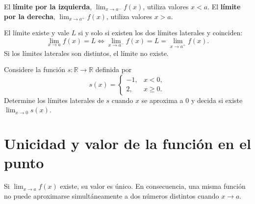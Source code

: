 \documentclass[10pt,a5paper]{article}
\newif\ifmostrarSoluciones
\begin{document}
\begin{center}
\end{center}

\begin{definicion}
El \textbf{límite por la izquierda}, $\lim_{x\to a^-}f(x)$, utiliza valores $x<a$. El \textbf{límite por la derecha}, $\lim_{x\to a^+}f(x)$, utiliza valores $x>a$.
\end{definicion}

\begin{teorema}
El límite existe y vale $L$ si y solo si existen los dos límites laterales y coinciden:
\[
\lim_{x\to a}f(x)=L
\iff
\lim_{x\to a^-}f(x)=L=\lim_{x\to a^+}f(x).
\]
Si los límites laterales son distintos, el límite no existe.
\end{teorema}

\begin{ejemplo}[salto]
Considere la función $s:\mathbb{R}\to\mathbb{R}$ definida por
\[
s(x)=
\begin{cases}
  -1, & x<0,\\
  2, & x\geq0.
\end{cases}
\]
Determine los límites laterales de $s$ cuando $x$ se aproxima a $0$ y decida si existe $\lim_{x\to0}s(x)$.
\end{ejemplo}
\ifmostrarSoluciones
\begin{solucion}
\[
\lim_{x\to0^-}s(x)=-1,\qquad
\lim_{x\to0^+}s(x)=2.
\]
Como son distintos, $\lim_{x\to0}s(x)$ no existe, aunque $s(0)=2$ sí está definido.
\end{solucion}
\else\vspace{13mm}\fi

\section*{Unicidad y valor de la función en el punto}

\begin{teorema}
Si $\lim_{x\to a}f(x)$ existe, su valor es único. En consecuencia, una misma función no puede aproximarse simultáneamente a dos números distintos cuando $x\to a$.
\end{teorema}
\end{document}
